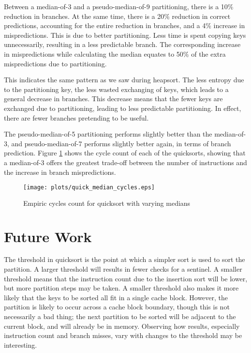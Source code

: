 Between a median-of-3 and a pseudo-median-of-9 partitioning, there is a
10\% reduction in branches. At the same time, there is a 20\% reduction in
correct predictions, accounting for the entire reduction in branches, and a 4\%
increase in mispredictions. This is due to better partitioning. Less time is
spent copying keys unnecessarily, resulting in a less predictable branch. The
corresponding increase in mispredictions while calculating the median equates to
50\% of the extra mispredictions due to partitioning.

This indicates the same pattern as we saw during heapsort.%
The less entropy due to the partitioning key, the less wasted exchanging of keys,
which leads to a general decrease in branches. This decrease means that the
fewer keys are exchanged due to partitioning, leading to less predictable
partitioning. In effect, there are fewer branches pretending to be useful.

The pseudo-median-of-5 partitioning performs slightly better than the
median-of-3, and pseudo-median-of-7 performs slightly better again, in
terms of branch prediction. Figure \ref{quick_median_cycles} shows the cycle
count of each of the quicksorts, showing that a median-of-3 offers the greatest
trade-off between the number of instructions and the increase in branch
mispredictions.

\begin{figure}
\texttt{[image: plots/quick\_median\_cycles.eps]}
\caption{Empiric cycles count for quicksort with varying medians}
\label{quick_median_cycles}
\end{figure}


\section{Future Work}
The threshold in quicksort is the point at which a simpler sort is used to sort
the partition. A larger threshold will results in fewer checks for a sentinel. A
smaller threshold means that the instruction count due to the insertion sort
will be lower, but more partition steps may be taken. A smaller threshold also
makes it more likely that the keys to be sorted all fit in a single cache
block. However, the partition is likely to occur across a cache block boundary,
though this is not necessarily a bad thing; the next partition to be sorted will
be adjacent to the current block, and will already be in memory. Observing how
results, especially instruction count and branch misses, vary with changes 
to the threshold may be interesting.

